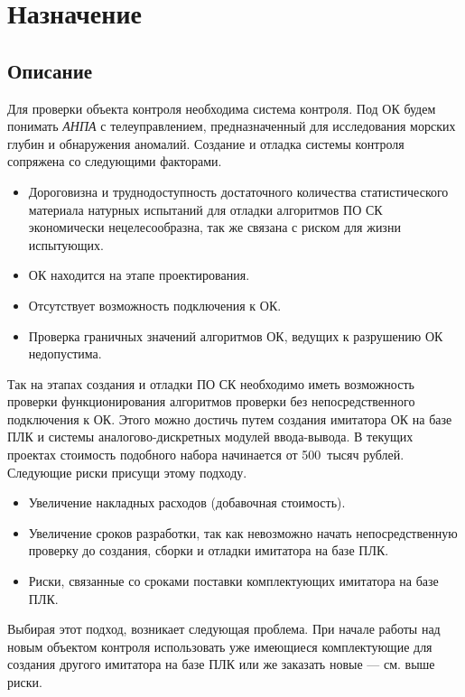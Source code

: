 \chapter*{Назначение}


\section*{Описание}

Для проверки объекта контроля необходима система контроля.
Под ОК будем понимать \textit{АНПА} с телеуправлением,
предназначенный для исследования морских глубин и обнаружения аномалий.
Создание и отладка системы контроля сопряжена со следующими факторами.
%
\begin{itemize}
    \item Дороговизна и труднодоступность достаточного количества статистического материала
    натурных испытаний для отладки алгоритмов ПО СК экономически нецелесообразна, так же связана с риском для жизни испытующих.
    \item ОК находится на этапе проектирования.
    \item Отсутствует возможность подключения к ОК.
    \item Проверка граничных значений алгоритмов ОК, ведущих к разрушению ОК недопустима.
\end{itemize}

Так на этапах создания и отладки ПО СК необходимо иметь возможность проверки
функционирования алгоритмов проверки без непосредственного подключения к ОК.
Этого можно достичь путем создания имитатора ОК на базе ПЛК и системы аналогово-дискретных
модулей ввода-вывода.
В  текущих проектах стоимость подобного набора начинается от 500~тысяч рублей.
Следующие риски присущи этому подходу.
\begin{itemize}
    \item Увеличение накладных расходов (добавочная стоимость).
    \item Увеличение сроков разработки, так как невозможно начать непосредственную проверку до 
        создания, сборки и отладки имитатора на базе ПЛК.
    \item Риски, связанные со сроками поставки комплектующих имитатора на базе ПЛК.
\end{itemize}
Выбирая этот подход, возникает следующая проблема. При начале работы над новым объектом контроля
использовать уже имеющиеся комплектующие для создания другого имитатора на базе ПЛК
или же заказать новые --- см. выше риски.

